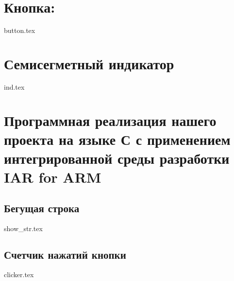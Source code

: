 \documentclass[15pt,a5paper,reqno]{article}
\begin{document}
\newpage


\section{Кнопка:}


{button.tex}

\newpage

\section{Семисегметный индикатор}

{ind.tex}

\newpage

\section{Программная реализация нашего проекта на языке С с применением
         интегрированной среды разработки IAR for ARM}

\subsection{Бегущая строка}

{show_str.tex}

\newpage

\subsection{Счетчик нажатий кнопки}

{clicker.tex}
\end{document}
